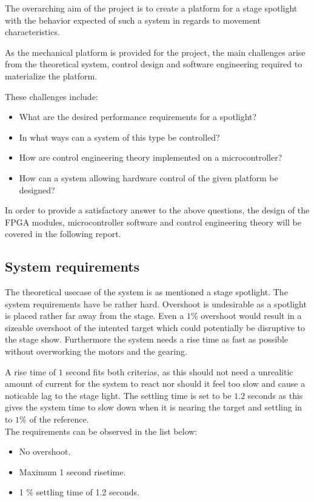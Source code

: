 \documentclass[../../main]{subfiles}
\begin{document}
The overarching aim of the project is to create a platform for a stage spotlight with the behavior expected of such a system in regards to movement characteristics.

As the mechanical platform is provided for the project, the main challenges arise from the theoretical system, control design and software engineering required to materialize the platform.

These challenges include:

\begin{itemize}
    \item What are the desired performance requirements for a spotlight?
    \item In what ways can a system of this type be controlled?
    \item How are control engineering theory implemented on a microcontroller?
    \item How can a system allowing hardware control of the given platform be designed?
\end{itemize}

In order to provide a satisfactory answer to the above questions, the design of the FPGA modules, microcontroller software and control engineering theory will be covered in the following report.

\subsection{System requirements}

The theoretical usecase of the system is as mentioned a stage spotlight. The system requirements have be rather hard.
Overshoot is undesirable as a spotlight is placed rather far away from the stage. Even a $1\%$ overshoot would result in a sizeable overshoot of the intented target which could potentially be disruptive to the stage show.
Furthermore the system needs a rise time as fast as possible without overworking the motors and the gearing.

A rise time of $1$ second fits both criterias, as this should not need a unrealitic amount of current for the system to react nor should it feel too slow and cause a noticable lag to the stage light.
The settling time is set to be $1.2$ seconds as this gives the system time to slow down when it is nearing the target and settling in to $1\%$ of the reference.
\\
The requirements can be observed in the list below:

\begin{itemize}
  \item No overshoot.
  \item Maximum 1 second risetime.
  \item 1 \% settling time of 1.2 seconds.
\end{itemize}
\end{document}
